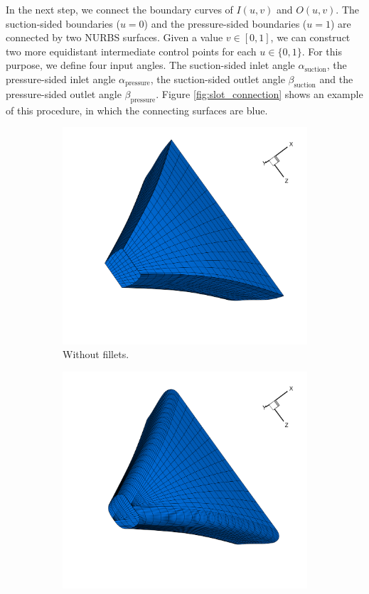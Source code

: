 \documentclass[a4paper, 11pt]{report}
\theoremstyle{definition}
\begin{document}
	In the next step, we connect the boundary curves of $I(u,v)$ and $O(u,v)$. The suction-sided boundaries ($u = 0$) and the pressure-sided boundaries ($u = 1$) are connected by two NURBS surfaces. Given a value $v \in [0,1]$, we can construct two more equidistant intermediate control points for each $u \in \{0,1\}$. For this purpose, we define four input angles. The suction-sided inlet angle $\alpha_\textrm{suction}$, the pressure-sided inlet angle $\alpha_\textrm{pressure}$, the suction-sided outlet angle $\beta_\textrm{suction}$ and the pressure-sided outlet angle $\beta_\textrm{pressure}$. Figure \ref{fig:slot_connection} shows an example of this procedure, in which the connecting surfaces are blue.

	\begin{figure}[H]
		\centering
		\begin{subfigure}{.39\textwidth}
			\includegraphics[width=\textwidth]{../tec/slots/17.png}
			\caption{Without fillets.}
		\end{subfigure}
		\begin{subfigure}{.39\textwidth}
			\includegraphics[width=\textwidth]{../tec/slots/18.png}

\end{subfigure}
\end{figure}
\end{document}

